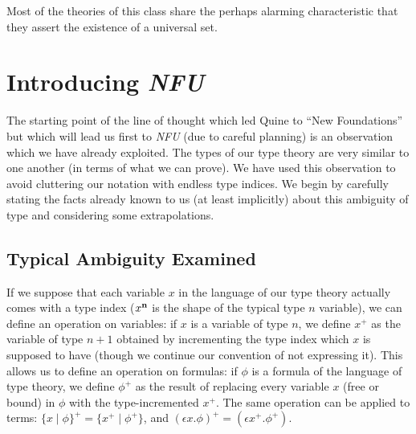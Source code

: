 \documentclass[12pt]{book}
\begin{document}
Most of the theories of this class share the perhaps alarming
characteristic that they assert the existence of a universal set.

\section{Introducing {\em NFU\/}}

The starting point of the line of thought which led Quine to ``New
Foundations'' but which will lead us first to {\em NFU\/} (due to
careful planning) is an observation which we have already exploited.
The types of our type theory are very similar to one another (in terms
of what we can prove).  We have used this observation to avoid
cluttering our notation with endless type indices.  We begin by
carefully stating the facts already known to us (at least implicitly)
about this ambiguity of type and considering some extrapolations.

\subsection{Typical Ambiguity Examined}

If we suppose that each variable $x$ in the language of our type
theory actually comes with a type index ($x^{\bf n}$ is the shape of
the typical type $n$ variable), we can define an operation on
variables: if $x$ is a variable of type $n$, we define $x^+$ as the
variable of type $n+1$ obtained by incrementing the type index which
$x$ is supposed to have (though we continue our convention of not
expressing it).  This allows us to define an operation on formulas: if
$\phi$ is a formula of the language of type theory, we define $\phi^+$
as the result of replacing every variable $x$ (free or bound) in
$\phi$ with the type-incremented $x^+$.  The same operation can be
applied to terms: $\{x \mid \phi\}^+ = \{x^+ \mid \phi^+\}$, and
$(\epsilon x.\phi)^+ = (\epsilon x^+.\phi^+)$.
\end{document}
